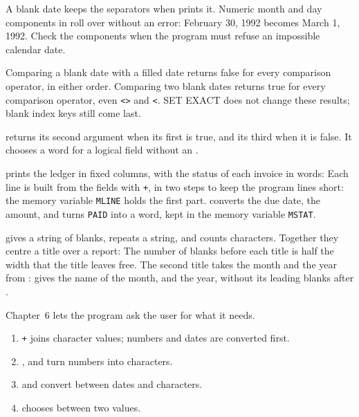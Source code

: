 A blank date keeps the separators when  prints it. Numeric month
and day components in  roll over without an error: February 30,
1992 becomes March 1, 1992. Check the components when the program must
refuse an impossible calendar date.

Comparing a blank date with a filled date returns false for every comparison
operator, in either order. Comparing two blank dates returns true for every
comparison operator, even \texttt{<>} and \texttt{<}. SET EXACT does not
change these results; blank index keys still come last.

 returns its second argument when its first is true, and its third when
it is false.  It chooses a word for a logical field without an .

 prints the ledger in fixed columns, with the status of each
invoice in words:
Each line is built from the fields with \texttt{+}, in two steps to keep the
program lines short: the memory variable \texttt{MLINE} holds the first part.
 converts the due date,  the amount, and 
turns \texttt{PAID} into a word, kept in the memory variable \texttt{MSTAT}.

 gives a string of blanks,  repeats a string, and
 counts characters.  Together they centre a title over a report:
The number of blanks before each title is half the width that the title leaves
free.  The second title takes the month and the year from :
 gives the name of the month, and  the year, without its
leading blanks after .

Chapter~6 lets the program ask the user for what it needs.

\begin{enumerate}
\item \texttt{+} joins character values; numbers and dates are converted first.
\item {},  and  turn numbers into characters.
\item {} and  convert between dates and characters.
\item {} chooses between two values.
\end{enumerate}

